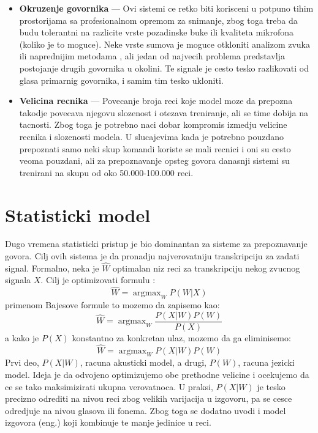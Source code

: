 \documentclass[a4paper]{article}
\DeclareMathOperator*{\argmax}{argmax}
\begin{document}
\begin{itemize}
  \item \textbf{Okruzenje govornika} --- 
  Ovi sistemi ce retko biti korisceni u potpuno tihim prostorijama sa profesionalnom opremom za snimanje, zbog toga treba da budu tolerantni na razlicite vrste pozadinske buke ili kvaliteta mikrofona (koliko je to moguce). 
  Neke vrste sumova je moguce otkloniti analizom zvuka ili naprednijim metodama \cite{xu2015enhancement}, ali jedan od najvecih problema predstavlja postojanje drugih govornika u okolini.
  Te signale je cesto tesko razlikovati od glasa primarnig govornika, i samim tim tesko ukloniti.
  
  \item \textbf{Velicina recnika} --- 
  Povecanje broja reci koje model moze da prepozna takodje povecava njegovu slozenost i otezava treniranje, ali se time dobija na tacnosti. 
  Zbog toga je potrebno naci dobar kompromis izmedju velicine recnika i slozenosti modela. 
  U slucajevima kada je potrebno pouzdano prepoznati samo neki skup komandi koriste se mali recnici i oni su cesto veoma pouzdani, ali za prepoznavanje opsteg govora danasnji sistemi su trenirani na skupu od oko 50.000-100.000 reci.
\end{itemize}

\section{Statisticki model}
Dugo vremena statisticki pristup je bio dominantan za sisteme za prepoznavanje govora.
Cilj ovih sistema je da pronadju najverovatniju transkripciju za zadati signal.
Formalno, neka je $\hat{W}$ optimalan niz reci za transkripciju nekog zvucnog signala $X$. Cilj je optimizovati formulu \cite{kamath2019nlp}:
\begin{equation*}
  \hat{W} = \argmax_{W} P(W|X)
\end{equation*}
primenom Bajesove formule to mozemo da zapisemo kao:
\begin{equation*}
  \hat{W} = \argmax_{W} \frac{P(X|W) P(W)}{P(X)}
\end{equation*}
a kako je $P(X)$ konstantno za konkretan ulaz, mozemo da ga eliminisemo:
\begin{equation*}
  \hat{W} = \argmax_{W} P(X|W) P(W)
\end{equation*}
Prvi deo, $P(X|W)$, racuna akusticki model, a drugi, $P(W)$, racuna jezicki model.
Ideja je da odvojeno optimizujemo obe prethodne velicine i ocekujemo da ce se tako maksimizirati ukupna verovatnoca.
U praksi, $P(X|W)$ je tesko precizno odrediti na nivou reci zbog velikih varijacija u izgovoru, pa se cesce odredjuje na nivou glasova ili fonema.
Zbog toga se dodatno uvodi i model izgovora (eng.) koji kombinuje te manje jedinice u reci. 
\end{document}
